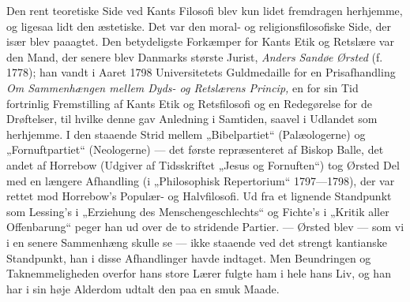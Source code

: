 \documentclass[12pt,a4paper,openany]{book}
\newcommand{\opage}[1]{\marginnote{\footnotesize\textit{[#1]}}}
\begin{document}
Den rent teoretiske Side ved Kants Filosofi blev kun lidet
\setcounter{footnote}{0}%
\opage{27}fremdragen herhjemme, og ligesaa lidt den æstetiske. Det var den
moral- og religionsfilosofiske Side, der især blev paaagtet. Den betydeligste
Forkæmper for Kants Etik og Retslære var den Mand, der senere blev Danmarks
største Jurist, \emph{Anders} \emph{Sandøe} \emph{Ørsted} (f. 1778); han vandt
i Aaret 1798 Universitetets Guldmedaille for en Prisafhandling \textit{Om
Sammenhængen mellem Dyds- og Retslærens Princip,} en for sin Tid fortrinlig
Fremstilling af Kants Etik og Retsfilosofi og en Redegørelse for de Drøftelser,
til hvilke denne gav Anledning i Samtiden, saavel i Udlandet som herhjemme. I
den staaende Strid mellem „Bibelpartiet“ (Palæologerne) og „Fornuftpartiet“
(Neologerne) --- det første repræsenteret af Biskop Balle, det andet af
Horrebow (Udgiver af Tidsskriftet „Jesus og Fornuften“) tog Ørsted Del med en
længere Afhandling (i „Philosophisk Repertorium“ 1797---1798), der var rettet
mod Horrebow's Populær- og Halvfilosofi. Ud fra et lignende Standpunkt som
Lessing's i „Erziehung des Menschengeschlechts“ og Fichte's i „Kritik aller
Offenbarung“ peger han ud over de to stridende Partier. --- Ørsted blev --- som
vi i en senere Sammenhæng skulle se --- ikke staaende ved det strengt
kantianske Standpunkt, han i disse Afhandlinger havde indtaget. Men Beundringen
og Taknemmeligheden overfor hans store Lærer fulgte ham i hele hans Liv, og han
har i sin høje Alderdom udtalt den paa en smuk Maade.
\end{document}

